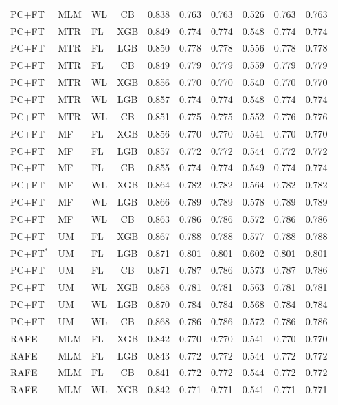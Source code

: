 \documentclass[9pt,a4paper]{article}
\begin{document}
\begin{scriptsize}
\begin{longtable}{lllcrrrrrr}
PC+FT & MLM & WL & CB  & 0.838 & 0.763 & 0.763 & 0.526 & 0.763 & 0.763 \\
PC+FT & MTR & FL & XGB & 0.849 & 0.774 & 0.774 & 0.548 & 0.774 & 0.774 \\
PC+FT & MTR & FL & LGB & 0.850 & 0.778 & 0.778 & 0.556 & 0.778 & 0.778 \\
PC+FT & MTR & FL & CB  & 0.849 & 0.779 & 0.779 & 0.559 & 0.779 & 0.779 \\
PC+FT & MTR & WL & XGB & 0.856 & 0.770 & 0.770 & 0.540 & 0.770 & 0.770 \\
PC+FT & MTR & WL & LGB & 0.857 & 0.774 & 0.774 & 0.548 & 0.774 & 0.774 \\
PC+FT & MTR & WL & CB  & 0.851 & 0.775 & 0.775 & 0.552 & 0.776 & 0.776 \\
PC+FT & MF  & FL & XGB & 0.856 & 0.770 & 0.770 & 0.541 & 0.770 & 0.770 \\
PC+FT & MF  & FL & LGB & 0.857 & 0.772 & 0.772 & 0.544 & 0.772 & 0.772 \\
PC+FT & MF  & FL & CB  & 0.855 & 0.774 & 0.774 & 0.549 & 0.774 & 0.774 \\
PC+FT & MF  & WL & XGB & 0.864 & 0.782 & 0.782 & 0.564 & 0.782 & 0.782 \\
PC+FT & MF  & WL & LGB & 0.866 & 0.789 & 0.789 & 0.578 & 0.789 & 0.789 \\
PC+FT & MF  & WL & CB  & 0.863 & 0.786 & 0.786 & 0.572 & 0.786 & 0.786 \\
PC+FT & UM  & FL & XGB & 0.867 & 0.788 & 0.788 & 0.577 & 0.788 & 0.788 \\
PC+FT$^*$ & UM & FL & LGB & 0.871 & 0.801 & 0.801 & 0.602 & 0.801 & 0.801 \\
PC+FT & UM  & FL & CB  & 0.871 & 0.787 & 0.786 & 0.573 & 0.787 & 0.786 \\
PC+FT & UM  & WL & XGB & 0.868 & 0.781 & 0.781 & 0.563 & 0.781 & 0.781 \\
PC+FT & UM  & WL & LGB & 0.870 & 0.784 & 0.784 & 0.568 & 0.784 & 0.784 \\
PC+FT & UM  & WL & CB  & 0.868 & 0.786 & 0.786 & 0.572 & 0.786 & 0.786 \\
\midrule
RAFE & MLM & FL & XGB & 0.842 & 0.770 & 0.770 & 0.541 & 0.770 & 0.770 \\
RAFE & MLM & FL & LGB & 0.843 & 0.772 & 0.772 & 0.544 & 0.772 & 0.772 \\
RAFE & MLM & FL & CB  & 0.841 & 0.772 & 0.772 & 0.544 & 0.772 & 0.772 \\
RAFE & MLM & WL & XGB & 0.842 & 0.771 & 0.771 & 0.541 & 0.771 & 0.771 \\

\end{longtable}
\end{scriptsize}
\end{document}
